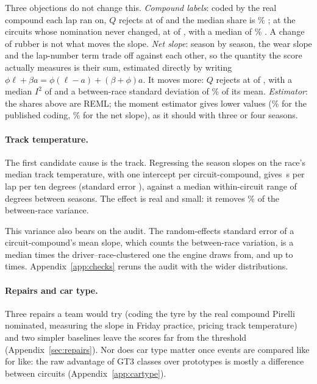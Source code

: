 \documentclass[11pt,a4paper]{article}
\begin{document}
Three objections do not change this. \emph{Compound labels}: coded by the real
compound each lap ran on, $Q$ rejects at \TauRealHet{} of \TauRealN{} and the
median share is \TauRealShareReml{}\% \TauRealShareRemlCi{}; at the
\TauUnchangedCircuits{} circuits whose nomination never changed, at
\TauUnchangedHet{} of \TauUnchangedN{}, with a median of
\TauUnchangedShareReml{}\% \TauUnchangedShareRemlCi{}. A change of rubber is
not what moves the slope. \emph{Net slope}: season by season, the wear slope and
the lap-number term trade off against each other, so the quantity the score
actually measures is their sum, estimated directly by writing
$\phi\ell + \beta a = \phi(\ell - a) + (\beta + \phi)a$. It moves more: $Q$
rejects at \TauNetHet{} of \TauNetN{}, with a median $I^2$ of \TauNetIsq{} and
a between-race standard deviation of \TauNetShareReml{}\% \TauNetShareRemlCi{}
of its mean. \emph{Estimator}: the shares above are REML; the moment estimator
gives lower values (\TauPubShareDl{}\% for the published coding,
\TauNetShareDl{}\% for the net slope), as it should with three or four seasons.

\paragraph{Track temperature.} The first candidate cause is the track. Regressing
the season slopes on the race's median track temperature, with one intercept
per circuit-compound, gives \TempTheta{}\,s per lap per ten degrees (standard
error \TempThetaSe{}), against a median within-circuit range of \TempRange{}
degrees between seasons. The effect is real and small: it removes
\TempShare{}\% of the between-race variance.

This variance also bears on the audit. The random-effects standard error of a
circuit-compound's mean slope, which counts the between-race variation, is a
median \VarSeInflation{} times the driver--race-clustered one the engine draws
from, and up to \VarSeInflationMax{} times. Appendix~\ref{app:checks} reruns the
audit with the wider distributions.

\paragraph{Repairs and car type.} Three repairs a team would try (coding the
tyre by the real compound Pirelli nominated, measuring the slope in Friday
practice, pricing track temperature) and two simpler baselines leave the scores
far from the threshold (Appendix~\ref{sec:repairs}). Nor does car type matter
once events are compared like for like: the raw advantage of GT3 classes over
prototypes is mostly a difference between circuits (Appendix~\ref{app:cartype}).
\end{document}
